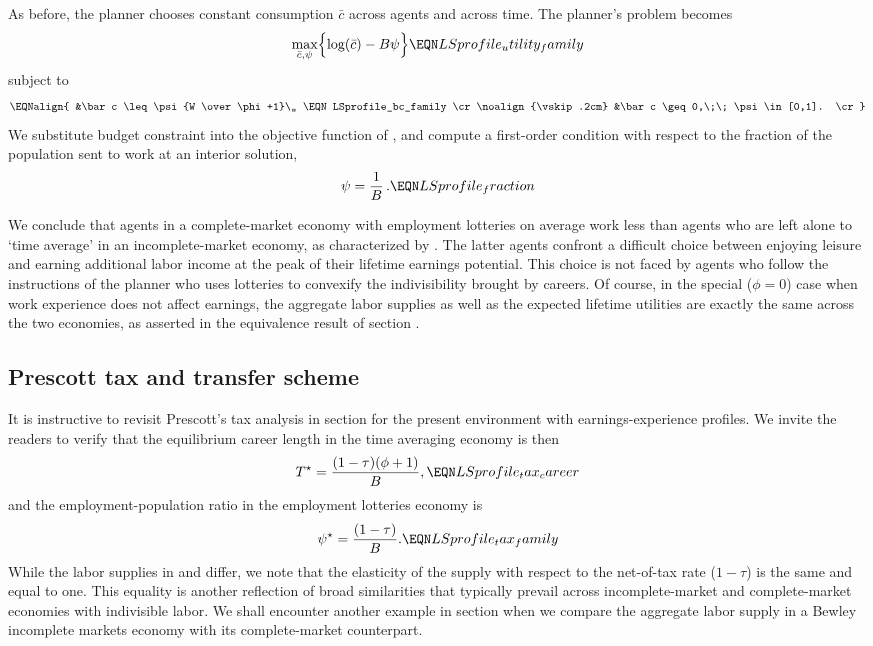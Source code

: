 As before, the planner chooses constant consumption $\bar c$
across agents and across time. The planner's problem becomes
$$
\max_{\bar c, \psi} \Bigl\{ \log(\bar c) - B \psi \Bigr\}
                                            \EQN LSprofile_utility_family
$$
subject to
$$\EQNalign{
&\bar c \leq \psi {W \over \phi+1}\,,        \EQN LSprofile_bc_family   \cr
\noalign{\vskip.2cm}
&\bar c \geq 0,\;\; \psi\in[0,1].  \cr}
$$
We substitute budget constraint  into the
objective function of , and
compute a first-order condition with respect to the fraction of the
population sent to work at an interior solution,
$$
\psi = {1 \over B}\,.                         \EQN LSprofile_fraction
$$

We conclude that agents in a complete-market economy with employment
lotteries on average work less than agents who are left alone to `time average'
in an  incomplete-market economy, as characterized by .
The latter agents confront a difficult choice between enjoying leisure
and earning additional labor income at the peak of their lifetime
earnings potential. This choice is not faced by  agents who
follow the instructions of the planner who uses lotteries to convexify
the indivisibility brought by careers. Of course, in the special
($\phi=0$) case when work experience does not affect earnings, the
aggregate labor supplies as well as the expected lifetime utilities
are exactly the same across the two economies, as asserted in the equivalence
result of section .



\subsection{Prescott tax and transfer scheme}

It is instructive to revisit Prescott's tax analysis in
section  for the present environment with
earnings-experience profiles. We invite the readers to verify
that the equilibrium career length in the time averaging
economy is then
$$
T^{\star} = {(1-\tau) (\phi +1) \over B },   \EQN LSprofile_tax_career
$$
and the employment-population ratio in the employment
lotteries economy is
$$
\psi^{\star} = {(1-\tau) \over B }.          \EQN LSprofile_tax_family
$$
While the labor supplies in  and
 differ, we note that the elasticity of
the supply with respect to the net-of-tax rate ($1-\tau$) is the
same and equal to one. This equality is another  reflection of  broad
similarities that typically prevail across incomplete-market and complete-market economies
with indivisible labor.  We shall encounter  another example  in section  when we compare the
aggregate labor supply  in a Bewley  incomplete markets
economy with its complete-market counterpart.
%


